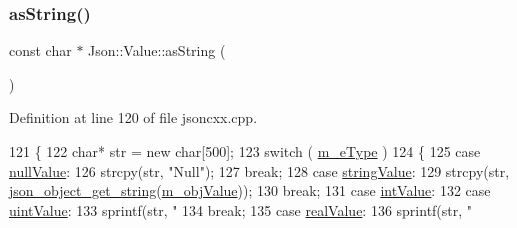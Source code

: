 \mbox{\label{class_json_1_1_value_a42268ca4dfc386562bee8707045b2263}} 
\subsubsection{\texorpdfstring{as\+String()}{asString()}}
{\footnotesize\ttfamily const char $\ast$ Json\+::\+Value\+::as\+String (\begin{DoxyParamCaption}{ }\end{DoxyParamCaption})}



Definition at line 120 of file jsoncxx.\+cpp.


\begin{DoxyCode}
121     \{
122         \textcolor{keywordtype}{char}* str = \textcolor{keyword}{new} \textcolor{keywordtype}{char}[500];
123         \textcolor{keywordflow}{switch} ( \hyperlink{class_json_1_1_value_ae6116e08a5c1833f858c1d29156365b1}{m\_eType} )
124         \{
125         \textcolor{keywordflow}{case} \hyperlink{namespace_json_a7d654b75c16a57007925868e38212b4ea7d9899633b4409bd3fc107e6737f8391}{nullValue}:
126             strcpy(str, \textcolor{stringliteral}{"Null"});
127             \textcolor{keywordflow}{break};
128         \textcolor{keywordflow}{case} \hyperlink{namespace_json_a7d654b75c16a57007925868e38212b4ea804ef857affea2d415843c73f261c258}{stringValue}:
129             strcpy(str, \hyperlink{json__object_8c_a48160f5bba7d298343045d2daca5e07a}{json\_object\_get\_string}(\hyperlink{class_json_1_1_value_a3a705e06c2dbc4a6e142b58b0cbca57e}{m\_objValue}));
130             \textcolor{keywordflow}{break};
131         \textcolor{keywordflow}{case} \hyperlink{namespace_json_a7d654b75c16a57007925868e38212b4eae5a9d708d5c9e23ae9bf98898522512d}{intValue}:
132         \textcolor{keywordflow}{case} \hyperlink{namespace_json_a7d654b75c16a57007925868e38212b4eaea788d9a3bb00adc6d68d97d43e1ccd3}{uintValue}:
133             sprintf(str, \textcolor{stringliteral}{"%
134             \textcolor{keywordflow}{break};
135         \textcolor{keywordflow}{case} \hyperlink{namespace_json_a7d654b75c16a57007925868e38212b4eab837c7b869c14d8be712deb45c9e490e}{realValue}:
136             sprintf(str, \textcolor{stringliteral}{"%
}}
\end{DoxyCode}
